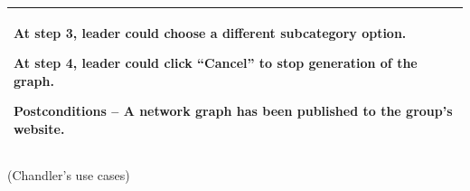 \documentclass[letterpaper]{article}
\begin{document}
\begin{flushleft}
\begin{supertabular}{|m{6.42126in}|}
{\color{black} At step 3, leader could choose a different subcategory
option.}

{\color{black} At step 4, leader could click
{\textquotedblleft}Cancel{\textquotedblright} to stop generation of the
graph.}

\color{black} Postconditions -- A network graph has been published to
the group{\textquoteright}s website.\\\hline
\end{supertabular}
\end{flushleft}

\bigskip


\bigskip


\bigskip


\bigskip


\bigskip


\bigskip


\bigskip


\bigskip


\bigskip


\bigskip


\bigskip


\bigskip


\bigskip


\bigskip


\bigskip


\bigskip


\bigskip


\bigskip


\bigskip


\bigskip


\bigskip


\bigskip


\bigskip


\bigskip


\bigskip


\bigskip


\bigskip


\bigskip


\bigskip


\bigskip


\bigskip


\bigskip


\bigskip


\bigskip


\bigskip


\bigskip

{\color{black}
(Chandler{\textquoteright}s use cases)}
\end{document}
